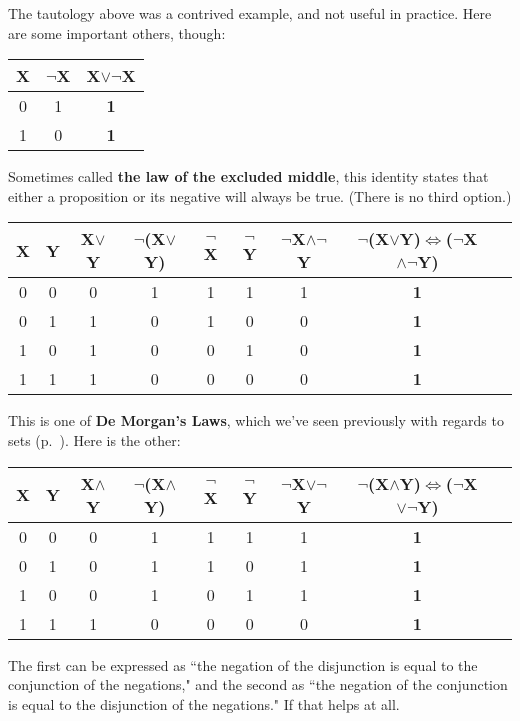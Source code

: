 The tautology above was a contrived example, and not useful in practice.
Here are some important others, though:
\begin{nobreak}
\begin{center}
\begin{tabular}{c|c c}
X & $\neg$X & \textbf{X$\vee\neg$X} \\
\hline
0 & 1 & \textbf{1} \\
1 & 0 & \textbf{1} \\
\end{tabular}
\end{center}
\end{nobreak}
Sometimes called \textbf{the law of the excluded middle}, this identity
states that either a proposition or its negative will always be true.
(There is no third option.)

\scriptsize
\begin{nobreak}
\begin{center}
\begin{tabular}{c c|c c c c c c c}
X & Y & X$\vee$Y & $\neg$(X$\vee$Y) & $\neg$X & $\neg$Y & $\neg$X$\wedge\neg$Y
& \textbf{$\neg$(X$\vee$Y)$\Leftrightarrow$($\neg$X$\wedge\neg$Y)} \\
\hline
0 & 0 & 0 & 1 & 1 & 1 & 1 & \textbf{1} \\
0 & 1 & 1 & 0 & 1 & 0 & 0 & \textbf{1} \\
1 & 0 & 1 & 0 & 0 & 1 & 0 & \textbf{1} \\
1 & 1 & 1 & 0 & 0 & 0 & 0 & \textbf{1} \\
\end{tabular}
\end{center}
\end{nobreak}
\normalsize
This is one of \textbf{De Morgan's Laws}, which we've seen previously with
regards to sets (p.~\pageref{demorganslaws}). Here is the other:
\scriptsize
\begin{nobreak}
\begin{center}
\begin{tabular}{c c|c c c c c c c}
X & Y & X$\wedge$Y & $\neg$(X$\wedge$Y) & $\neg$X & $\neg$Y & $\neg$X$\vee\neg$Y
& \textbf{$\neg$(X$\wedge$Y)$\Leftrightarrow$($\neg$X$\vee\neg$Y)} \\
\hline
0 & 0 & 0 & 1 & 1 & 1 & 1 & \textbf{1} \\
0 & 1 & 0 & 1 & 1 & 0 & 1 & \textbf{1} \\
1 & 0 & 0 & 1 & 0 & 1 & 1 & \textbf{1} \\
1 & 1 & 1 & 0 & 0 & 0 & 0 & \textbf{1} \\
\end{tabular}
\end{center}
\end{nobreak}
\normalsize
{}
The first can be expressed as ``the negation of the disjunction is equal to
the conjunction of the negations," and the second as ``the negation of the
conjunction is equal to the disjunction of the negations." If that helps at
all.


